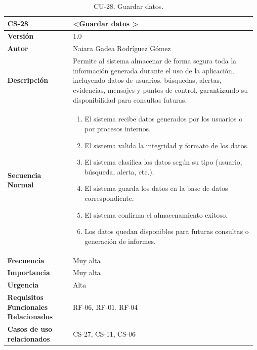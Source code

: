 \begin{table}[htbp] %
\centering
\begin{tabular}{ |m{3cm}|m{11cm}|  } 
\hline
\cellcolor[HTML]{B9E3F0}\centering\textbf{CS-28} & \cellcolor[HTML]{B9E3F0}\textbf{\textless Guardar datos \textgreater}\\

\hline
\cellcolor[HTML]{EFEFEF}\textbf{Versión}             & 1.0  \\
\hline
\cellcolor[HTML]{EFEFEF}\textbf{Autor}                & Naiara Gadea Rodríguez Gómez\\
\hline
\cellcolor[HTML]{EFEFEF}\textbf{Descripción}                & {Permite al sistema almacenar de forma segura toda la información generada durante el uso de la aplicación, incluyendo datos de usuarios, búsquedas, alertas, evidencias, mensajes y puntos de control, garantizando su disponibilidad para consultas futuras.}\\
\hline
\cellcolor[HTML]{EFEFEF}\textbf{Secuencia \newline Normal}                &                 
        \begin{enumerate}
			\item El sistema recibe datos generados por los usuarios o por procesos internos.
			\item El sistema valida la integridad y formato de los datos.
			\item El sistema clasifica los datos según su tipo (usuario, búsqueda, alerta, etc.).
			\item El sistema guarda los datos en la base de datos correspondiente.
			\item El sistema confirma el almacenamiento exitoso.
			\item Los datos quedan disponibles para futuras consultas o generación de informes.
		\end{enumerate}\\
\hline
\cellcolor[HTML]{EFEFEF}\textbf{Frecuencia}                & Muy alta\\
\hline
\cellcolor[HTML]{EFEFEF}\textbf{Importancia}                & Muy alta\\
\hline
\cellcolor[HTML]{EFEFEF}\textbf{Urgencia}                & Alta\\
\hline
\cellcolor[HTML]{EFEFEF}\textbf{Requisitos Funcionales Relacionados}                & {RF-06, RF-01, RF-04}\\
\hline
\cellcolor[HTML]{EFEFEF}\textbf{Casos de uso relacionados}                & {CS-27, CS-11, CS-06}\\
\hline
\end{tabular}
\caption{CU-28. Guardar datos.}
\end{table}

